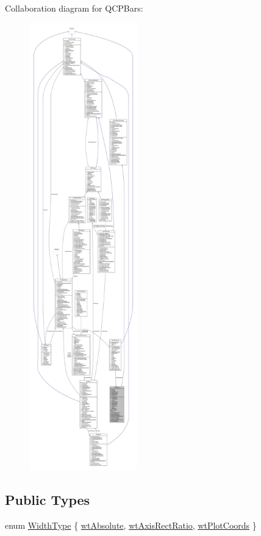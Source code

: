 Collaboration diagram for Q\+C\+P\+Bars\+:\nopagebreak
\begin{figure}[H]
\begin{center}
\leavevmode
\includegraphics[height=550pt]{class_q_c_p_bars__coll__graph}
\end{center}
\end{figure}
\subsection*{Public Types}
\begin{DoxyCompactItemize}
\item 
enum \hyperlink{class_q_c_p_bars_a65dbbf1ab41cbe993d71521096ed4649}{Width\+Type} \{ \hyperlink{class_q_c_p_bars_a65dbbf1ab41cbe993d71521096ed4649ab74315c9aa77df593c58dd25dfc0de35}{wt\+Absolute}, 
\hyperlink{class_q_c_p_bars_a65dbbf1ab41cbe993d71521096ed4649a90bc09899361ad3422ff277f7c790ffe}{wt\+Axis\+Rect\+Ratio}, 
\hyperlink{class_q_c_p_bars_a65dbbf1ab41cbe993d71521096ed4649aad3cc60ae1bfb1160a30237bee9eaf10}{wt\+Plot\+Coords}
 \}
\end{DoxyCompactItemize}
